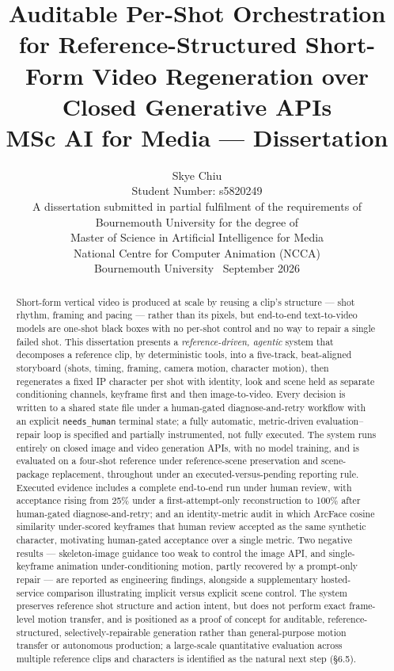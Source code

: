 \documentclass[10pt,twocolumn,letterpaper]{article}
\title{\vspace{-1.2em}\textbf{Auditable Per-Shot Orchestration for Reference-Structured Short-Form Video Regeneration over Closed Generative APIs}\\[2pt]
\large MSc AI for Media --- Dissertation}
\author{{\large Skye Chiu}\\[2pt]\normalsize Student Number: s5820249\\[10pt]\normalsize A dissertation submitted in partial fulfilment of the requirements of\\\normalsize Bournemouth University for the degree of\\\normalsize Master of Science in Artificial Intelligence for Media\\[10pt]\normalsize National Centre for Computer Animation (NCCA)\\\normalsize Bournemouth University \textbullet\ September 2026}
\date{}
\begin{document}
\onecolumn
\maketitle
\begin{abstract}
Short-form vertical video is produced at scale by reusing a clip's structure --- shot rhythm, framing and pacing --- rather than its pixels, but end-to-end text-to-video models are one-shot black boxes with no per-shot control and no way to repair a single failed shot. This dissertation presents a \emph{reference-driven, agentic} system that decomposes a reference clip, by deterministic tools, into a five-track, beat-aligned storyboard (shots, timing, framing, camera motion, character motion), then regenerates a fixed IP character per shot with identity, look and scene held as separate conditioning channels, keyframe first and then image-to-video. Every decision is written to a shared state file under a human-gated diagnose-and-retry workflow with an explicit \texttt{needs\_human} terminal state; a fully automatic, metric-driven evaluation--repair loop is specified and partially instrumented, not fully executed. The system runs entirely on closed image and video generation APIs, with no model training, and is evaluated on a four-shot reference under reference-scene preservation and scene-package replacement, throughout under an executed-versus-pending reporting rule. Executed evidence includes a complete end-to-end run under human review, with acceptance rising from 25\% under a first-attempt-only reconstruction to 100\% after human-gated diagnose-and-retry; and an identity-metric audit in which ArcFace cosine similarity under-scored keyframes that human review accepted as the same synthetic character, motivating human-gated acceptance over a single metric. Two negative results --- skeleton-image guidance too weak to control the image API, and single-keyframe animation under-conditioning motion, partly recovered by a prompt-only repair --- are reported as engineering findings, alongside a supplementary hosted-service comparison illustrating implicit versus explicit scene control. The system preserves reference shot structure and action intent, but does not perform exact frame-level motion transfer, and is positioned as a proof of concept for auditable, reference-structured, selectively-repairable generation rather than general-purpose motion transfer or autonomous production; a large-scale quantitative evaluation across multiple reference clips and characters is identified as the natural next step (\S{}6.5).
\end{abstract}
\end{document}
